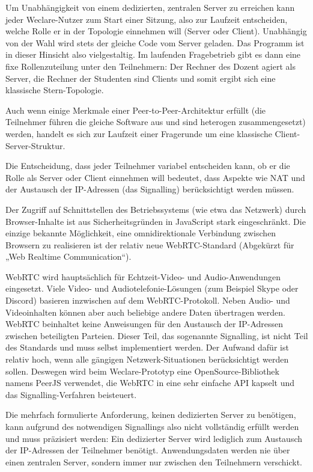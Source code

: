 Um Unabhängigkeit von einem dedizierten, zentralen Server zu erreichen kann jeder Weclare-Nutzer zum Start einer Sitzung, also zur Laufzeit entscheiden, welche Rolle er in der Topologie einnehmen will (Server oder Client). Unabhängig von der Wahl wird stets der gleiche Code vom Server geladen. Das Programm ist in dieser Hinsicht also vielgestaltig. Im laufenden Fragebetrieb gibt es dann eine fixe Rollenzuteilung unter den Teilnehmern: Der Rechner des Dozent agiert als Server, die Rechner der Studenten sind Clients und somit ergibt sich eine klassische Stern-Topologie.

Auch wenn einige Merkmale einer Peer-to-Peer-Architektur erfüllt (die Teilnehmer führen die gleiche Software aus und sind heterogen zusammengesetzt) werden, handelt es sich zur Laufzeit einer Fragerunde um eine klassische Client-Server-Struktur.

Die Entscheidung, dass jeder Teilnehmer variabel entscheiden kann, ob er die Rolle als Server oder Client einnehmen will bedeutet, dass Aspekte wie NAT und der Austausch der IP-Adressen (das Signalling) berücksichtigt werden müssen.

Der Zugriff auf Schnittstellen des Betriebssystems (wie etwa das Netzwerk) durch Browser-Inhalte ist aus Sicherheitsgründen in JavaScript stark eingeschränkt. Die einzige bekannte Möglichkeit, eine omnidirektionale Verbindung zwischen Browsern zu realisieren ist der relativ neue WebRTC-Standard (Abgekürzt für „Web Realtime Communication“).

WebRTC wird hauptsächlich für Echtzeit-Video- und Audio-Anwendungen eingesetzt. Viele Video- und Audiotelefonie-Lösungen (zum Beispiel Skype oder Discord) basieren inzwischen auf dem WebRTC-Protokoll. Neben Audio- und Videoinhalten können aber auch beliebige andere Daten übertragen werden. WebRTC beinhaltet keine Anweisungen für den Austausch der IP-Adressen zwischen beteiligten Parteien. Dieser Teil, das sogenannte Signalling, ist nicht Teil des Standards und muss selbst implementiert werden. Der Aufwand dafür ist relativ hoch, wenn alle gängigen Netzwerk-Situationen berücksichtigt werden sollen. Deswegen wird beim Weclare-Prototyp eine OpenSource-Bibliothek namens PeerJS verwendet, die WebRTC in eine sehr einfache API kapselt und das Signalling-Verfahren beisteuert.

Die mehrfach formulierte Anforderung, keinen dedizierten Server zu benötigen, kann aufgrund des notwendigen Signallings also nicht vollständig erfüllt werden und muss präzisiert werden: Ein dedizierter Server wird lediglich zum Austausch der IP-Adressen der Teilnehmer benötigt. Anwendungsdaten werden nie über einen zentralen Server, sondern immer nur zwischen den Teilnehmern verschickt.


